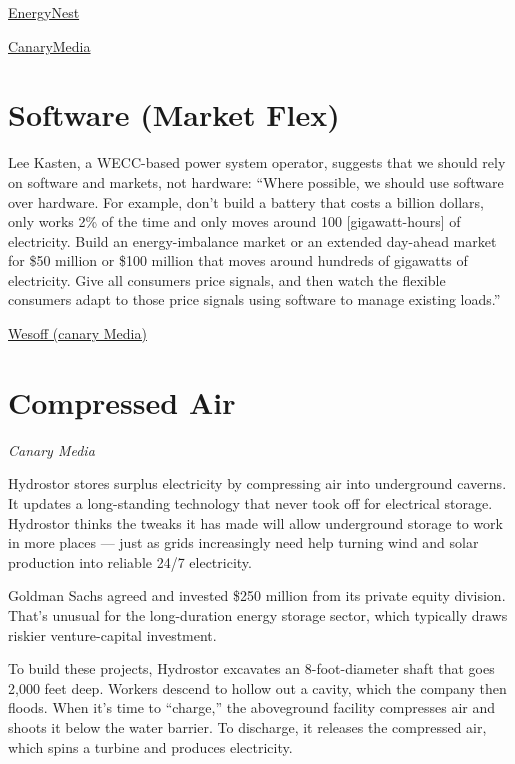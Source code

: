 \documentclass[
]{book}
\begin{document}
\href{https://energy-nest.com/}{EnergyNest}

\href{https://www.energy-storage.news/news/thermal-energy-storage-startup-energynest-secures-us130-million-investment?utm_source=newsletter\&utm_medium=email\&utm_campaign=canary}{CanaryMedia}

\hypertarget{software-market-flex}{%
\section{Software (Market Flex)}\label{software-market-flex}}

Lee Kasten, a WECC-based power system operator, suggests that we should rely on software and markets, not hardware: ``Where possible, we should use software over hardware. For example, don't build a battery that costs a billion dollars, only works 2\% of the time and only moves around 100 {[}gigawatt-hours{]} of electricity. Build an energy-imbalance market or an extended day-ahead market for \$50 million or \$100 million that moves around hundreds of gigawatts of electricity. Give all consumers price signals, and then watch the flexible consumers adapt to those price signals using software to manage existing loads.''

\href{https://www.canarymedia.com/articles/long-duration-storage-roundup-news-players-and-technology/}{Wesoff (canary Media)}

\hypertarget{compressed-air}{%
\section{Compressed Air}\label{compressed-air}}

\emph{Canary Media}

Hydrostor stores surplus electricity by compressing air into underground caverns. It updates a long-standing technology that never took off for electrical storage. Hydrostor thinks the tweaks it has made will allow underground storage to work in more places --- just as grids increasingly need help turning wind and solar production into reliable 24/7 electricity.

Goldman Sachs agreed and invested \$250 million from its private equity division. That's unusual for the long-duration energy storage sector, which typically draws riskier venture-capital investment.

To build these projects, Hydrostor excavates an 8-foot-diameter shaft that goes 2,000 feet deep. Workers descend to hollow out a cavity, which the company then floods. When it's time to \hspace{0pt}``charge,'' the aboveground facility compresses air and shoots it below the water barrier. To discharge, it releases the compressed air, which spins a turbine and produces electricity.
\end{document}
